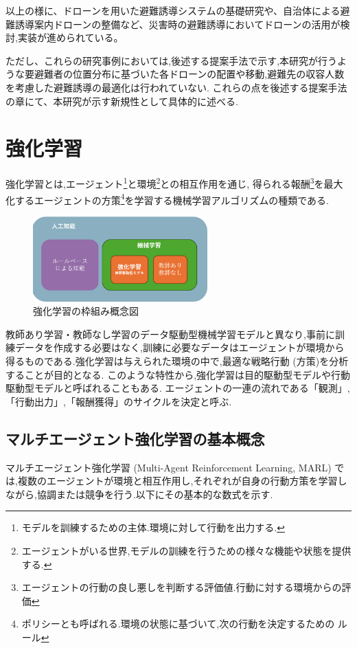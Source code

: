 以上の様に、ドローンを用いた避難誘導システムの基礎研究や、自治体による避難誘導案内ドローンの整備など、災害時の避難誘導においてドローンの活用が検討,実装が進められている。\par

ただし、これらの研究事例においては,後述する提案手法で示す,本研究が行うような要避難者の位置分布に基づいた各ドローンの配置や移動,避難先の収容人数を考慮した避難誘導の最適化は行われていない.
これらの点を後述する提案手法の章にて、本研究が示す新規性として具体的に述べる.

\section{強化学習}
強化学習とは,エージェント\footnote{モデルを訓練するための主体.環境に対して行動を出力する.}と環境\footnote{エージェントがいる世界,モデルの訓練を行うための様々な機能や状態を提供する.}との相互作用を通じ,
得られる報酬\footnote{エージェントの行動の良し悪しを判断する評価値.行動に対する環境からの評価}を最大化するエージェントの方策\footnote{ポリシーとも呼ばれる.環境の状態に基づいて,次の行動を決定するための
ルール}を学習する機械学習アルゴリズムの種類である.
\begin{figure}[H] 
  \centering 
  \includegraphics[width=0.6\textwidth]{Figures/2024-12-09 202235.png}
  \caption{強化学習の枠組み概念図} 
  \label{fig:01} 
\end{figure}
教師あり学習・教師なし学習のデータ駆動型機械学習モデルと異なり,事前に訓練データを作成する必要はなく,訓練に必要なデータはエージェントが環境から得るものである.強化学習は与えられた環境の中で,最適な戦略行動 (方策)を分析することが目的となる.
このような特性から,強化学習は目的駆動型モデルや行動駆動型モデルと呼ばれることもある.
エージェントの一連の流れである「観測」,「行動出力」,「報酬獲得」のサイクルを決定と呼ぶ.
\subsection{マルチエージェント強化学習の基本概念}

マルチエージェント強化学習 (Multi-Agent Reinforcement Learning, MARL) では,複数のエージェントが環境と相互作用し,それぞれが自身の行動方策を学習しながら,協調または競争を行う.以下にその基本的な数式を示す.

